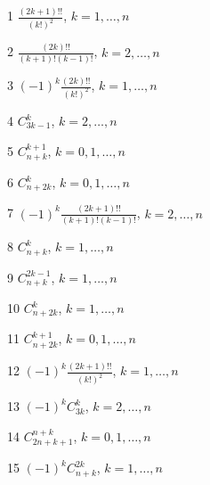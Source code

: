 \documentclass[11pt, russian]{article}
\begin{document}
1 
$\frac{(2k+1)!!}{(k!)^2}$, $k=1,\ldots,n$\par\vspace{5mm}

2 
$\frac{(2k)!!}{(k+1)!(k-1)!}$, $k=2,\ldots,n$\par\vspace{5mm}

3 
$(-1)^{k}\frac{(2k)!!}{(k!)^2}$, $k=1,\ldots,n$\par\vspace{5mm}

4 
$C_{3k-1}^{k}$, $k=2,\ldots,n$\par\vspace{5mm}

5 
$C_{n+k}^{k+1}$, $k=0,1,\ldots,n$\par\vspace{5mm}

6 
$C_{n+2k}^{k}$, $k=0,1,\ldots,n$\par\vspace{5mm}

7 
$(-1)^{k}\frac{(2k+1)!!}{(k+1)!(k-1)!}$, $k=2,\ldots,n$\par\vspace{5mm}

8 
$C_{n+k}^{k}$, $k=1,\ldots,n$\par\vspace{5mm}

9 
$C_{n+k}^{2k-1}$, $k=1,\ldots,n$\par\vspace{5mm}

10 
$C_{n+2k}^{k}$, $k=1,\ldots,n$\par\vspace{5mm}

11 
$C_{n+2k}^{k+1}$, $k=0,1,\ldots,n$\par\vspace{5mm}

12 
$(-1)^{k}\frac{(2k+1)!!}{(k!)^2}$, $k=1,\ldots,n$\par\vspace{5mm}

13 
$(-1)^{k}C_{3k}^{k}$, $k=2,\ldots,n$\par\vspace{5mm}

14 
$C_{2n+k+1}^{n+k}$, $k=0,1,\ldots,n$\par\vspace{5mm}

15 
$(-1)^{k}C_{n+k}^{2k}$, $k=1,\ldots,n$\par\vspace{5mm}
\end{document}
